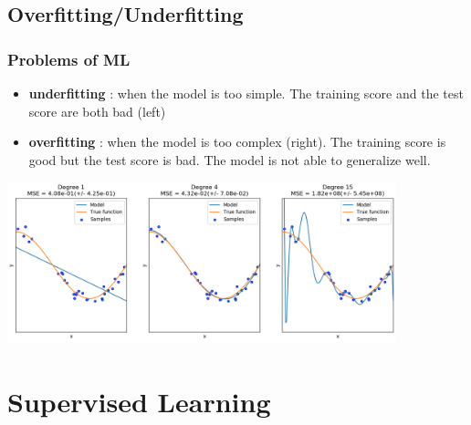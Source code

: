 \documentclass{beamer}
\begin{document}
\subsection{Overfitting/Underfitting}
\begin{frame}
  \frametitle{Problems of ML}
  \begin{itemize}
    \item \textbf{underfitting} : when the model is too simple. The training
    score and the test score are both bad (left)
    \item \textbf{overfitting} : when the model is too complex (right). The
    training score is good but the test score is bad. The model is not able to
    generalize well.
  \end{itemize}
  \begin{center}
    \includegraphics[height=4.7cm]{img/underfitting.png}
  \end{center}
\end{frame}



\section{Supervised Learning}

\end{document}
